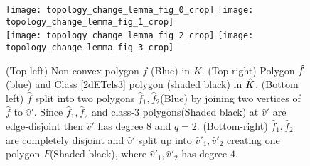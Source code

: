 \begin{figure}[ht!] 
	\centering
	\texttt{[image: topology\_change\_lemma\_fig\_0\_crop]}
	\quad
	\texttt{[image: topology\_change\_lemma\_fig\_1\_crop]}
        \vspace*{0.1in}\\
	\texttt{[image: topology\_change\_lemma\_fig\_2\_crop]}
	\quad
	\texttt{[image: topology\_change\_lemma\_fig\_3\_crop]}
	\caption{\label{fig:topologychangelemma}
          (Top left) Non-convex polygon $f$ (Blue) in $K$.
          (Top right) Polygon $\hat{f}$ (blue) and Class \ref{2dETcls3} polygon (shaded black) in $\hat{K}$.
          (Bottom left) $\hat{f}$ split into two polygons $\hat{f}_1, \hat{f}_2$(Blue) by joining two vertices of $\hat{f}$ to $\hat{v}'$. Since $\hat{f}_1, \hat{f}_2$ and class-3 polygons(Shaded black) at $\hat{v}'$ are edge-disjoint then $\hat{v}'$ has degree $8$ and $q=2$.
          (Bottom-right) $\hat{f}_1, \hat{f}_2$ are completely disjoint and $\hat{v}'$ split up into $\hat{v}'_1, \hat{v}'_2$ creating one polygon $F$(Shaded black), where $\hat{v}'_1, \hat{v}'_2$ has degree $4$. }
\end{figure}  

